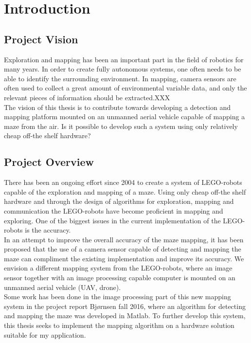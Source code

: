 \section{Introduction}
\subsection{Project Vision}
Exploration and mapping has been an important part in the field of robotics for many years. In order to create fully autonomous systems, one often needs to be able to identify the surrounding environment. In mapping, camera sensors are often used to collect a great amount of environmental variable data, and only the relevant pieces of information should be extracted.XXX \\

The vision of this thesis is to contribute towards developing a detection and mapping platform mounted on an unmanned aerial vehicle capable of mapping a maze from the air. Is it possible to develop such a system using only relatively cheap off-the shelf hardware? 

\newpage
\subsection{Project Overview}
There has been an ongoing effort since 2004 to create a system of LEGO-robots capable of the exploration and mapping of a maze. Using only cheap off-the shelf hardware and through the design of algorithms for exploration, mapping and communication the LEGO-robots have become proficient in mapping and exploring. One of the biggest issues in the current implementation of the LEGO-robots is the accuracy.\\

In an attempt to improve the overall accuracy of the maze mapping, it has been proposed that the use of a camera sensor capable of detecting and mapping the maze can compliment the existing implementation and improve its accuracy. We envision a different mapping system from the LEGO-robots, where an image sensor together with an image processing capable computer is mounted on an unmanned aerial vehicle (UAV, drone).\\

Some work has been done in the image processing part of this new mapping system in the project report Bjørnsen fall 2016\cite{kris}, where an algorithm for detecting and mapping the maze was developed in Matlab. To further develop this system, this thesis seeks to implement the mapping algorithm on a hardware solution suitable for my application. 

